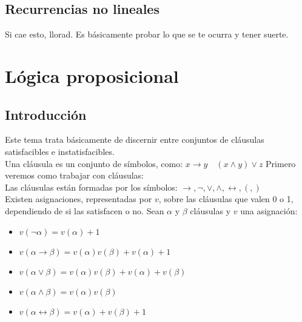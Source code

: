 \documentclass[a4paper]{article}
\begin{document}
\subsection{Recurrencias no lineales}
Si cae esto, llorad. Es básicamente probar lo que se te ocurra y tener suerte.




\section{Lógica proposicional}
\subsection{Introducción}
Este tema trata básicamente de discernir entre conjuntos de cláusulas satisfacibles e instatisfacibles.\\
Una cláusula es un conjunto de símbolos, como: $x\rightarrow y\quad (x\land y)\lor z$
Primero veremos como trabajar con cláusulas:\\
Las cláusulas están formadas por los símbolos: $\rightarrow, \neg, \lor, \land, \leftrightarrow, (, )$\\
Existen asignaciones, representadas por $v$, sobre las cláusulas que valen 0 o 1, dependiendo de si las satisfacen o no. Sean $\alpha$ y $\beta$ cláusulas y $v$ una asignación:
\begin{itemize}
\item $v(\neg\alpha)=v(\alpha)+1$
\item $v(\alpha\rightarrow\beta)=v(\alpha)v(\beta)+v(\alpha)+1$
\item $v(\alpha\lor\beta)=v(\alpha)v(\beta)+v(\alpha)+v(\beta)$
\item $v(\alpha\land\beta)=v(\alpha)v(\beta)$
\item $v(\alpha\leftrightarrow\beta)=v(\alpha)+v(\beta)+1$
\end{itemize}
\end{document}
